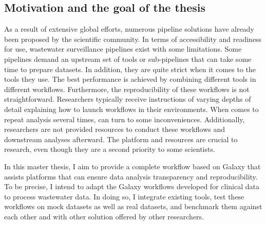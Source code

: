     \subsection{Motivation and the goal of the thesis}
    As a result of extensive global efforts, numerous pipeline solutions have already been proposed by the scientific community. In terms of accessibility and readiness for use, wastewater surveillance pipelines exist with some limitations. Some pipelines demand an upstream set of tools or sub-pipelines that can take some time to prepare datasets. In addition, they are quite strict when it comes to the tools they use. The best performance is achieved by combining different tools in different workflows. Furthermore, the reproducibility of these workflows is not straightforward. Researchers typically receive instructions of varying depths of detail explaining how to launch workflows in their environments. When comes to repeat analysis several times, can turn to some inconveniences. Additionally, researchers are not provided resources to conduct these workflows and downstream analyses afterward. The platform and resources are crucial to research, even though they are a second priority to some scientists.

    In this master thesis, I aim to provide a complete workflow based on Galaxy that assists platforms that can ensure data analysis transparency and reproducibility. To be precise, I intend to adapt the Galaxy workflows developed for clinical data to process wastewater data. In doing so, I integrate existing tools, test these workflows on mock datasets as well as real datasets, and benchmark them against each other and with other solution offered by other researchers.
    
     




